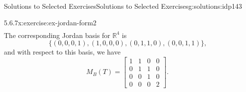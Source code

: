 \documentclass[oneside,10pt,]{book}
\numberwithin{equation}{section}
\newcommand{\bbm}{\begin{bmatrix}}
\newcommand{\ebm}{\end{bmatrix}}
\newcommand{\R}{\mathbb{R}}
\newcommand{\amp}{&}
\begin{document}
\begin{solutions-chapter}{Solutions to Selected Exercises}{}{Solutions to Selected Exercises}{}{}{g:solutions:idp143}
\begin{inlinesolution}{5.6.7}{}{x:exercise:ex-jordan-form2}
\begin{align*}
\end{align*}
The corresponding Jordan basis for \(\R^4\) is%
\begin{equation*}
\{(0,0,0,1),(1,0,0,0),(0,1,1,0),(0,0,1,1)\}\text{,}
\end{equation*}
and with respect to this basis, we have%
\begin{equation*}
M_B(T) = \bbm 1\amp 1\amp 0\amp 0\\
0\amp 1\amp 1\amp 0\\
0\amp 0\amp 1\amp 0\\
0\amp 0\amp 0\amp 2\ebm\text{.}
\end{equation*}
%
\end{inlinesolution}%
\end{solutions-chapter}
\end{document}
